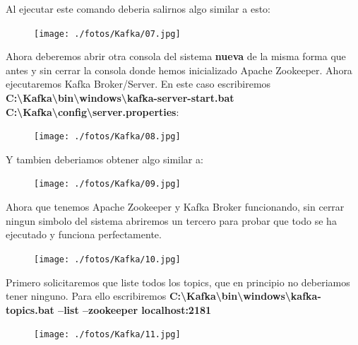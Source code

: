 \documentclass[a4paper,10pt]{article}
\begin{document}
Al ejecutar este comando deberia salirnos algo similar a esto:

\begin{figure}[H]
\begin{center}
\texttt{[image: ./fotos/Kafka/07.jpg]}
\end{center}
\end{figure}

Ahora deberemos abrir otra consola del sistema \textbf{nueva} de la misma forma que antes y sin cerrar la consola donde hemos inicializado Apache Zookeeper. Ahora ejecutaremos Kafka Broker/Server. En este caso escribiremos \textbf{C:\textbackslash Kafka\textbackslash bin\textbackslash windows\textbackslash kafka-server-start.bat C:\textbackslash Kafka\textbackslash config\textbackslash server.properties}:

\begin{figure}[H]
\begin{center}
\texttt{[image: ./fotos/Kafka/08.jpg]}
\end{center}
\end{figure}

Y tambien deberiamos obtener algo similar a:

\begin{figure}[H]
\begin{center}
\texttt{[image: ./fotos/Kafka/09.jpg]}
\end{center}
\end{figure}

Ahora que tenemos Apache Zookeeper y Kafka Broker funcionando, sin cerrar ningun simbolo del sistema abriremos un tercero para probar que todo se ha ejecutado y funciona perfectamente.

\begin{figure}[H]
\begin{center}
\texttt{[image: ./fotos/Kafka/10.jpg]}
\end{center}
\end{figure}

Primero solicitaremos que liste todos los topics, que en principio no deberiamos tener ninguno. Para ello escribiremos \textbf{C:\textbackslash Kafka\textbackslash bin\textbackslash windows\textbackslash kafka-topics.bat --list --zookeeper localhost:2181} 

\begin{figure}[H]
\begin{center}
\texttt{[image: ./fotos/Kafka/11.jpg]}
\end{center}
\end{figure}
\end{document}
